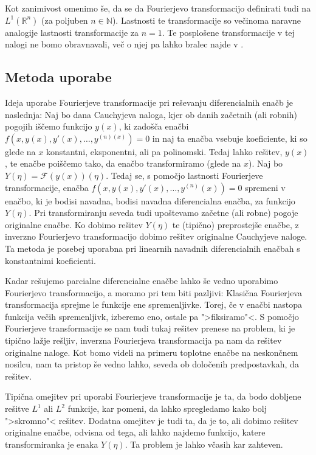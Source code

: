 \documentclass[a4paper, 10pt]{article}
\newcommand{\mth}[1]{\ensuremath{\mathbb{#1}}}
\newcommand{\R}{\mth{R}}
\newcommand{\N}{\mth{N}}
\begin{document}
			Kot zanimivost omenimo še, da se da Fourierjevo transformacijo definirati tudi na $L^1(\R^n)$ (za poljuben $n\in\N$). Lastnosti te transformacije so večinoma naravne analogije lastnosti transformacije za $n = 1$. Te posplošene transformacije v tej nalogi ne bomo obravnavali, več o njej pa lahko bralec najde v \cite{bib:Mag}.
			
		\subsection{Metoda uporabe}
			Ideja uporabe Fourierjeve transformacije pri reševanju diferencialnih enačb je naslednja:
			Naj bo dana Cauchyjeva naloga, kjer ob danih začetnih (ali robnih) pogojih iščemo funkcijo $y(x)$, ki zadošča enačbi $f(x, y(x), y'(x), \ldots, y^{(n)(x)})=0$ in naj ta enačba vsebuje koeficiente, ki so glede na $x$ konstantni, eksponentni, ali pa polinomski. Tedaj lahko rešitev, $y(x)$, te enačbe poiščemo tako, da enačbo transformiramo (glede na $x$). Naj bo $Y(\eta)=\mathcal{F}(y(x))(\eta)$. Tedaj se, s pomočjo lastnosti Fourierjeve transformacije, enačba $f(x, y(x), y'(x), \ldots, y^{(n)}(x)) = 0$ spremeni v enačbo, ki je bodisi navadna, bodisi navadna diferencialna enačba, za funkcijo $Y(\eta)$. Pri transformiranju seveda tudi upoštevamo začetne (ali robne) pogoje originalne enačbe. Ko dobimo rešitev $Y(\eta)$ te (tipično) preprostejše enačbe, z inverzno Fourierjevo transformacijo dobimo rešitev originalne Cauchyjeve naloge. Ta metoda je posebej uporabna pri linearnih navadnih diferencialnih enačbah s konstantnimi koeficienti.
			
			Kadar rešujemo parcialne diferencialne enačbe lahko še vedno uporabimo Fourierjevo transformacijo, a moramo pri tem biti pazljivi: Klasična Fourierjeva transformacija sprejme le funkcije ene spremenljivke. Torej, če v enačbi nastopa funkcija večih spremenljivk, izberemo eno, ostale pa ">fiksiramo"<. S pomočjo Fourierjeve transformacije se nam tudi tukaj rešitev prenese na problem, ki je tipično lažje rešljiv, inverzna Fourierjeva transformacija pa nam da rešitev originalne naloge. Kot bomo videli na primeru toplotne enačbe na neskončnem nosilcu, nam ta pristop še vedno lahko, seveda ob določenih predpostavkah, da rešitev.
			
			Tipična omejitev pri uporabi Fourierjeve transformacije je ta, da bodo dobljene rešitve $L^1$ ali $L^2$ funkcije, kar pomeni, da lahko spregledamo kako bolj ">skromno"< rešitev. Dodatna omejitev je tudi ta, da je to, ali dobimo rešitev originalne enačbe, odvisna od tega, ali lahko najdemo funkcijo, katere transformiranka je enaka $Y(\eta)$. Ta problem je lahko včasih kar zahteven.
			
\end{document}
